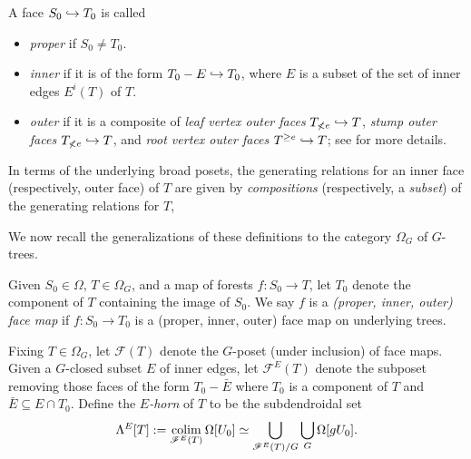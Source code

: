 \documentclass[a4paper,10pt,draft]{article}%
\begin{document}
\begin{definition}
      A face $S_0 \hookrightarrow T_0$ is called
      \begin{itemize}
      \item \textit{proper} if $S_0 \neq T_0$.
      \item \textit{inner} if it is of the form $T_0 - E \hookrightarrow T_0$, where $E$ is a subset of the set of inner edges $E^i(T)$ of $T$.
      \item \textit{outer} if it is a composite of
            \textit{leaf vertex outer faces} $T_{\not< e}\hookrightarrow T$,
            \textit{stump outer faces} $T_{\not< e}\hookrightarrow T$,
            and \textit{root vertex outer faces} $T^{\geq e} \hookrightarrow T$;
            see \cite[Notation 5.41]{Per17} for more details.
      \end{itemize}
\end{definition}

\begin{remark}
      In terms of the underlying broad posets,
      the generating relations for an inner face (respectively, outer face) of $T$ are given by
      \textit{compositions} (respectively, a \textit{subset})
      of the generating relations for $T$,
\end{remark}

We now recall the generalizations of these definitions to the category $\Omega_G$ of $G$-trees.

\begin{definition}
      Given $S_0 \in \Omega$, $T \in \Omega_G$, and a map of forests $f: S_0 \to T$, let
      $T_0$ denote the component of $T$ containing the image of $S_0$.
      We say $f$ is a \textit{(proper, inner, outer) face map} if
      $f: S_0 \to T_0$ is a (proper, inner, outer) face map on underlying trees.
\end{definition}

\begin{definition}
      Fixing $T\in \Omega_G$,
      let $\mathscr{F}(T)$ denote the $G$-poset (under inclusion) of face maps.
      Given a $G$-closed subset $E$ of inner edges, let
      $\mathscr{F}^{E}(T)$ denote the subposet removing those faces of the form
      $T_0 - \bar E$
      where $T_0$ is a component of $T$ and $\bar E \subseteq E \cap T_0$.
      Define the \textit{$E$-horn} of $T$ to be the subdendroidal set
      \begin{equation}
            \Lambda^{E}[T]
            := \mathop{\operatorname{colim}}\limits_{\mathscr{F}^E(T)} \Omega[U_0]
            \simeq \mathop{\bigcup}\limits_{\mathscr{F}^E(T)/G}\mathop{\bigcup}\limits_{G}\Omega[g U_0].
      \end{equation}
  \end{definition}
\end{document}
